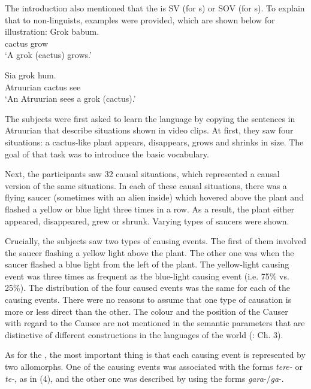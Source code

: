 \documentclass[output=paper]{langsci/langscibook}
\begin{document}
\noindent The introduction also mentioned that the  is SV (for s) or SOV (for s). To explain that to non-linguists, examples were provided, which are shown below for illustration: 
\newpage
\ea\label{ex:levshina:2} 
\gll Grok         babum.\\
     cactus      grow\\
\glt ‘A grok (cactus) grows.'      
\z

\ea\label{ex:levshina:3}
\gll Sia                 grok            hum.\\
     Atruurian      cactus        see\\
\glt ‘An Atruurian sees a grok (cactus).'
\z

The subjects were first asked to learn the language by copying the sentences in Atruurian that describe situations shown in video clips. At first, they saw four situations: a cactus-like plant appears, disappears, grows and shrinks in size. The goal of that task was to introduce the basic vocabulary. 

Next, the participants saw 32 causal situations, which represented a causal version of the same situations. In each of these causal situations, there was a flying saucer (sometimes with an alien inside) which hovered above the plant and flashed a yellow or blue light three times in a row. As a result, the plant either appeared, disappeared, grew or shrunk. Varying types of saucers were shown. 

Crucially, the subjects saw two types of causing events. The first of them involved the saucer flashing a yellow light above the plant. The other one was when the saucer flashed a blue light from the left of the plant. The yellow-light causing event was three times as frequent as the blue-light causing event (i.e. 75\% vs. 25\%). The distribution of the four caused events was the same for each of the causing events. There were no reasons to assume that one type of causation is more or less direct than the other. The colour and the position of the Causer with regard to the Causee are not mentioned in the semantic parameters that are distinctive of different  constructions in the languages of the world (\citealt{Levshina2018_Effic}: Ch. 3). 

As for the , the most important thing is that each causing event is represented by two allomorphs. One of the causing events was associated with the forms \textit{tere-} or \textit{te-}, as in (4), and the other one was described by using the forms \textit{gara}{}-/\textit{ga}{}-.
\end{document}
